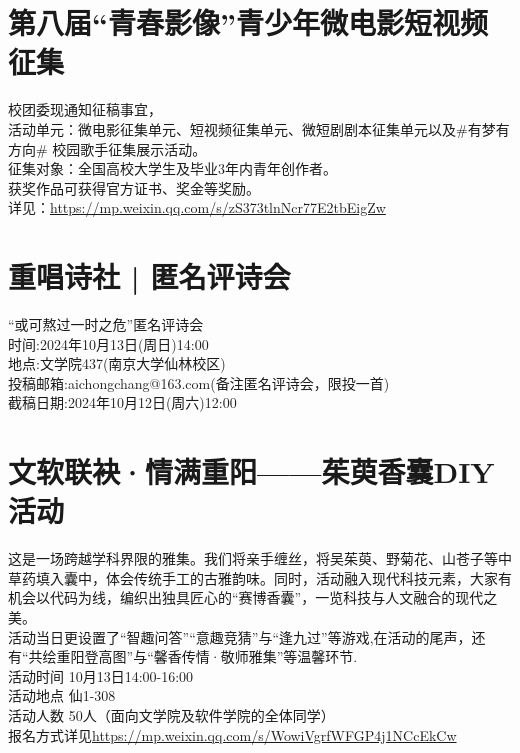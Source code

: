 \documentclass[letterpaper, 12pt]{article}
\begin{document}
\begin{multicols}{2}
\section{第八届“青春影像”青少年微电影短视频征集}
校团委现通知征稿事宜，\\
活动单元：微电影征集单元、短视频征集单元、微短剧剧本征集单元以及#有梦有方向# 校园歌手征集展示活动。\\
征集对象：全国高校大学生及毕业3年内青年创作者。\\
获奖作品可获得官方证书、奖金等奖励。\\
详见：\url{https://mp.weixin.qq.com/s/zS373tlnNcr77E2tbEigZw}
\section{重唱诗社 | 匿名评诗会}
“或可熬过一时之危”匿名评诗会\\
时间:2024年10月13日(周日)14:00\\
地点:文学院437(南京大学仙林校区)\\
投稿邮箱:aichongchang@163.com(备注匿名评诗会，限投一首)\\
截稿日期:2024年10月12日(周六)12:00\\
\section{文软联袂·情满重阳——茱萸香囊DIY活动}
这是一场跨越学科界限的雅集。我们将亲手缠丝，将吴茱萸、野菊花、山苍子等中草药填入囊中，体会传统手工的古雅韵味。同时，活动融入现代科技元素，大家有机会以代码为线，编织出独具匠心的“赛博香囊”，一览科技与人文融合的现代之美。\\
活动当日更设置了“智趣问答”“意趣竞猜”与“逢九过”等游戏,在活动的尾声，还有“共绘重阳登高图”与“馨香传情·敬师雅集”等温馨环节.\\
活动时间 10月13日14:00-16:00\\
活动地点 仙1-308\\
活动人数 50人（面向文学院及软件学院的全体同学）\\
报名方式详见\url{https://mp.weixin.qq.com/s/WowiVgrfWFGP4j1NCcEkCw}

\end{multicols} 
\end{document}

